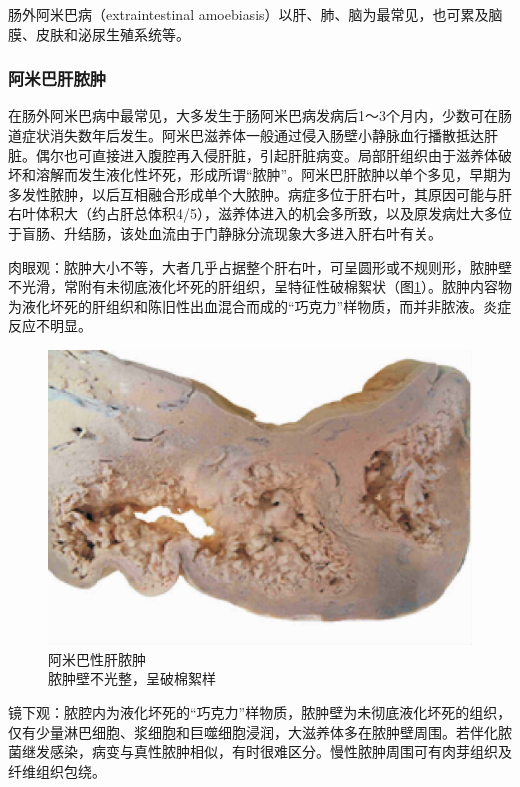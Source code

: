 肠外阿米巴病（extraintestinal
amoebiasis）以肝、肺、脑为最常见，也可累及脑膜、皮肤和泌尿生殖系统等。

\subsubsection{阿米巴肝脓肿}

在肠外阿米巴病中最常见，大多发生于肠阿米巴病发病后1～3个月内，少数可在肠道症状消失数年后发生。阿米巴滋养体一般通过侵入肠壁小静脉血行播散抵达肝脏。偶尔也可直接进入腹腔再入侵肝脏，引起肝脏病变。局部肝组织由于滋养体破坏和溶解而发生液化性坏死，形成所谓“脓肿”。阿米巴肝脓肿以单个多见，早期为多发性脓肿，以后互相融合形成单个大脓肿。病症多位于肝右叶，其原因可能与肝右叶体积大（约占肝总体积4/5），滋养体进入的机会多所致，以及原发病灶大多位于盲肠、升结肠，该处血流由于门静脉分流现象大多进入肝右叶有关。

肉眼观：脓肿大小不等，大者几乎占据整个肝右叶，可呈圆形或不规则形，脓肿壁不光滑，常附有未彻底液化坏死的肝组织，呈特征性破棉絮状（图\ref{fig15-3}）。脓肿内容物为液化坏死的肝组织和陈旧性出血混合而成的“巧克力”样物质，而并非脓液。炎症反应不明显。

\begin{figure}[!htbp]
 \centering
 \includegraphics{./images/Image00247.jpg}
 \captionsetup{justification=centering}
 \caption{阿米巴性肝脓肿\\ {\small 脓肿壁不光整，呈破棉絮样}}
\label{fig15-3}
  \end{figure}

镜下观：脓腔内为液化坏死的“巧克力”样物质，脓肿壁为未彻底液化坏死的组织，仅有少量淋巴细胞、浆细胞和巨噬细胞浸润，大滋养体多在脓肿壁周围。若伴化脓菌继发感染，病变与真性脓肿相似，有时很难区分。慢性脓肿周围可有肉芽组织及纤维组织包绕。

